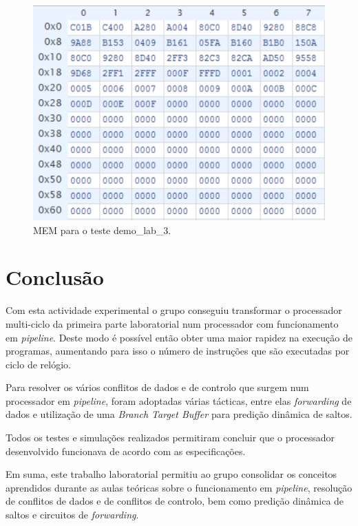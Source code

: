 \documentclass[a4paper]{article}
\begin{document}
		\begin{figure}[h]
			\centering
			\includegraphics[width=1.\textwidth]{img/imem_3}
			\caption{MEM para o teste demo\_lab\_3.}
			\label{fig:imem_3}
		\end{figure}
		
	\section{Conclusão}
	
	Com esta actividade experimental o grupo conseguiu transformar o processador multi-ciclo da primeira parte laboratorial num processador com funcionamento em \textit{pipeline}. Deste modo é possível então obter uma maior rapidez na execução de programas, aumentando para isso o número de instruções que são executadas por ciclo de relógio.
	
	Para resolver os vários conflitos de dados e de controlo que surgem num processador em \textit{pipeline}, foram adoptadas várias tácticas, entre elas \textit{forwarding} de dados e utilização de uma \textit{Branch Target Buffer} para predição dinâmica de saltos.
	
	 Todos os testes e simulações realizados permitiram concluir que o processador desenvolvido funcionava de acordo com as especificações.
	 
	  Em suma, este trabalho laboratorial permitiu ao grupo consolidar os conceitos aprendidos durante as aulas teóricas sobre o funcionamento em \textit{pipeline}, resolução de conflitos de dados e de conflitos de controlo, bem como predição dinâmica de saltos e circuitos de \textit{forwarding}.
\end{document}
